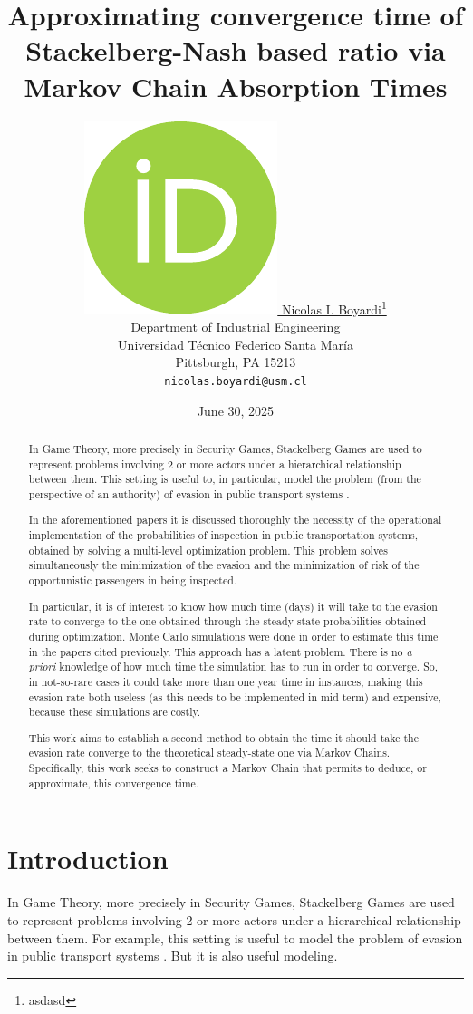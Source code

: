\documentclass{article}
\title{Approximating convergence time of Stackelberg-Nash based ratio via Markov Chain Absorption Times}
\date{June 30, 2025}
\author{ \href{https://orcid.org/0000-0000-0000-0000}{\includegraphics[scale=0.06]{orcid.pdf}\hspace{1mm} Nicolas I. Boyardi}\thanks{asdasd} \\
	Department of Industrial Engineering\\
	Universidad Técnico Federico Santa María\\
	Pittsburgh, PA 15213 \\
	\texttt{nicolas.boyardi@usm.cl} \\
}
\begin{document}
\maketitle

\begin{abstract}
	In Game Theory, more precisely in Security Games, Stackelberg Games are used to represent problems involving 2 or more actors under a hierarchical relationship between them. This setting is useful to, in particular, model the problem (from the perspective of an authority) of evasion in public transport systems \citep{FareInspection} \citep{BROTCORNE20211}.\par
In the aforementioned papers it is discussed thoroughly the necessity of the operational implementation of the probabilities of inspection in public transportation systems, obtained by solving a multi-level optimization problem. This problem solves simultaneously the minimization of the evasion and the minimization of risk of the opportunistic passengers in being inspected.\par
In particular, it is of interest to know how much time (days) it will take to the evasion rate to converge to the one obtained through the steady-state probabilities obtained during optimization. Monte Carlo simulations were done in order to estimate this time in the papers cited previously. This approach has a latent problem. There is no \textit{a priori} knowledge of how much time the simulation has to run in order to converge. So, in not-so-rare cases it could take more than one year time in instances, making this evasion rate both useless (as this needs to be implemented in mid term) and expensive, because these simulations are costly.\par
This work aims to establish a second method to obtain the time it should take the evasion rate converge to the theoretical steady-state one via Markov Chains. Specifically, this work seeks to construct a Markov Chain that permits to deduce, or approximate, this convergence time.\par
%
\end{abstract}



\section{Introduction}
In Game Theory, more precisely in Security Games, Stackelberg Games are used to represent problems involving 2 or more actors under a hierarchical relationship between them. For example, this setting is useful to model the problem of evasion in public transport systems \citep{FareInspection} \citep{BROTCORNE20211}. But it is also useful modeling.\par
\end{document}

